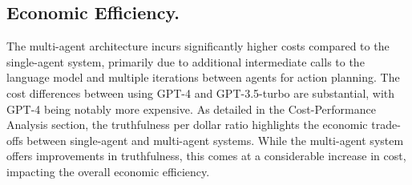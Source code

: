         
        \subsection{Economic Efficiency.} 
            The multi-agent architecture incurs significantly higher costs compared to the single-agent system, primarily due to additional intermediate calls to the language model and multiple iterations between agents for action planning. The cost differences between using GPT-4 and GPT-3.5-turbo are substantial, with GPT-4 being notably more expensive.
            As detailed in the Cost-Performance Analysis section, the truthfulness per dollar ratio highlights the economic trade-offs between single-agent and multi-agent systems. While the multi-agent system offers improvements in truthfulness, this comes at a considerable increase in cost, impacting the overall economic efficiency.
            

